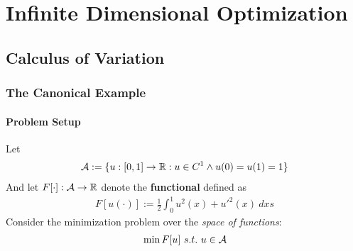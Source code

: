 \documentclass{article}
\begin{document}
	\section{Infinite Dimensional Optimization}
	\subsection{Calculus of Variation}
	\subsubsection{The Canonical Example}
	\paragraph{Problem Setup} Let
	\begin{align}
		\mathcal{{A}} := \{u:[0, 1] \to \mathbb{R} : u \in C^1 \land u(0) = u(1) = 1\}
	\end{align}
	And let $F[\cdot]: \mathcal{{A}} \to \mathbb{R}$ denote the \textbf{functional} defined as 
	\begin{align}
		F[u(\cdot)] := \frac{1}{2} \int_0^1 u^2(x) + u'^2(x)\ dxs
	\end{align}
	Consider the minimization problem over the \emph{space of functions}:
	\begin{align}
		\min F[u]\ s.t.\ u \in \mathcal{{A}}
	\end{align}
\end{document}
